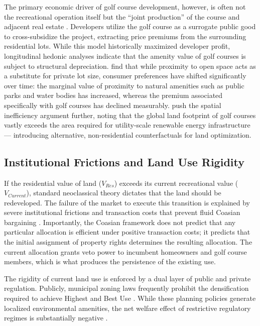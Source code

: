 \documentclass[11pt, letterpaper]{article}
\begin{document}
The primary economic driver of golf course development, however, is often not the recreational operation itself but the ``joint production'' of the course and adjacent real estate \parencite{Limehouse2012}. Developers utilize the golf course as a surrogate public good to cross-subsidize the project, extracting price premiums from the surrounding residential lots. While this model historically maximized developer profit, longitudinal hedonic analyses indicate that the amenity value of golf courses is subject to structural depreciation. \textcite{Cho2009} find that while proximity to open space acts as a substitute for private lot size, consumer preferences have shifted significantly over time: the marginal value of proximity to natural amenities such as public parks and water bodies has increased, whereas the premium associated specifically with golf courses has declined measurably. \textcite{Weinand2025} push the spatial inefficiency argument further, noting that the global land footprint of golf courses vastly exceeds the area required for utility-scale renewable energy infrastructure --- introducing alternative, non-residential counterfactuals for land optimization.

\subsection{Institutional Frictions and Land Use Rigidity}

If the residential value of land ($V_{Res}$) exceeds its current recreational value ($V_{Current}$), standard neoclassical theory dictates that the land should be redeveloped. The failure of the market to execute this transition is explained by severe institutional frictions and transaction costs that prevent fluid Coasian bargaining \parencite{Coase1960}. Importantly, the Coasian framework does not predict that any particular allocation is efficient under positive transaction costs; it predicts that the initial assignment of property rights determines the resulting allocation. The current allocation grants veto power to incumbent homeowners and golf course members, which is what produces the persistence of the existing use.

The rigidity of current land use is enforced by a dual layer of public and private regulation. Publicly, municipal zoning laws frequently prohibit the densification required to achieve Highest and Best Use \parencite{Fischel2015}. While these planning policies generate localized environmental amenities, the net welfare effect of restrictive regulatory regimes is substantially negative \parencite{Cheshire2002}.
\end{document}
